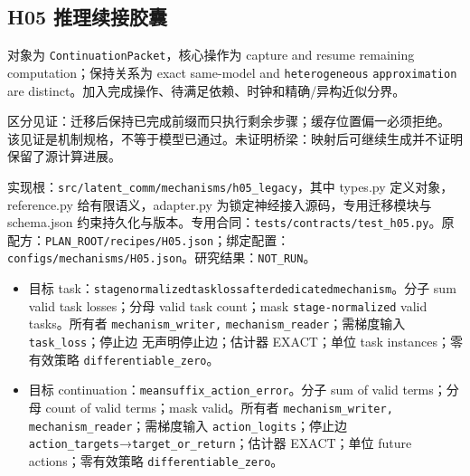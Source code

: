 \documentclass[
  10pt,
]{article}
\begin{document}
\subsection{H05
推理续接胶囊}\label{h05-ux63a8ux7406ux7eedux63a5ux80f6ux56ca}

对象为 \nolinkurl{ContinuationPacket}，核心操作为 capture and resume
remaining computation；保持关系为 exact same-model and
\nolinkurl{heterogeneous} \nolinkurl{approximation} are
distinct。加入完成操作、待满足依赖、时钟和精确/异构近似分界。

区分见证：迁移后保持已完成前缀而只执行剩余步骤；缓存位置偏一必须拒绝。
该见证是机制规格，不等于模型已通过。未证明桥梁：映射后可继续生成并不证明保留了源计算进展。

实现根：{\small\nolinkurl{src/latent_comm/mechanisms/h05_legacy}}，其中
types.py 定义对象，reference.py 给有限语义，adapter.py
为锁定神经接入源码，专用迁移模块与 schema.json
约束持久化与版本。专用合同：{\small\nolinkurl{tests/contracts/test_h05.py}}。原配方：{\small\nolinkurl{PLAN_ROOT/recipes/H05.json}}；绑定配置：{\small\nolinkurl{configs/mechanisms/H05.json}}。研究结果：\nolinkurl{NOT_RUN}。

\begin{itemize}
\item
  目标
  task：{\small\nolinkurl{stage}\hspace{0.333em}\nolinkurl{normalized}\hspace{0.333em}\nolinkurl{task}\hspace{0.333em}\nolinkurl{loss}\hspace{0.333em}\nolinkurl{after}\hspace{0.333em}\nolinkurl{dedicated}\hspace{0.333em}\nolinkurl{mechanism}}。分子
  sum valid task losses；分母 valid task count；mask
  \nolinkurl{stage-normalized} valid tasks。所有者
  \nolinkurl{mechanism_writer,} \nolinkurl{mechanism_reader}；需梯度输入
  \nolinkurl{task_loss}；停止边 无声明停止边；估计器 EXACT；单位 task
  instances；零有效策略 \nolinkurl{differentiable_zero}。
\item
  目标
  continuation：{\small\nolinkurl{mean}\hspace{0.333em}\nolinkurl{suffix_action_error}}。分子
  sum of valid terms；分母 count of valid terms；mask valid。所有者
  \nolinkurl{mechanism_writer,} \nolinkurl{mechanism_reader}；需梯度输入
  \nolinkurl{action_logits}；停止边
  \nolinkurl{action_targets}→\nolinkurl{target_or_return}；估计器
  EXACT；单位 future actions；零有效策略
  \nolinkurl{differentiable_zero}。
\end{itemize}
\end{document}
